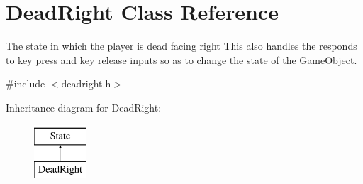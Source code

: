 \hypertarget{classDeadRight}{\section{Dead\-Right Class Reference}
\label{classDeadRight}
}


The state in which the player is dead facing right This also handles the responds to key press and key release inputs so as to change the state of the \hyperlink{classGameObject}{Game\-Object}.  




{\ttfamily \#include $<$deadright.\-h$>$}

Inheritance diagram for Dead\-Right\-:\begin{figure}[H]
\begin{center}
\leavevmode
\includegraphics[height=2.000000cm]{classDeadRight}
\end{center}
\end{figure}
